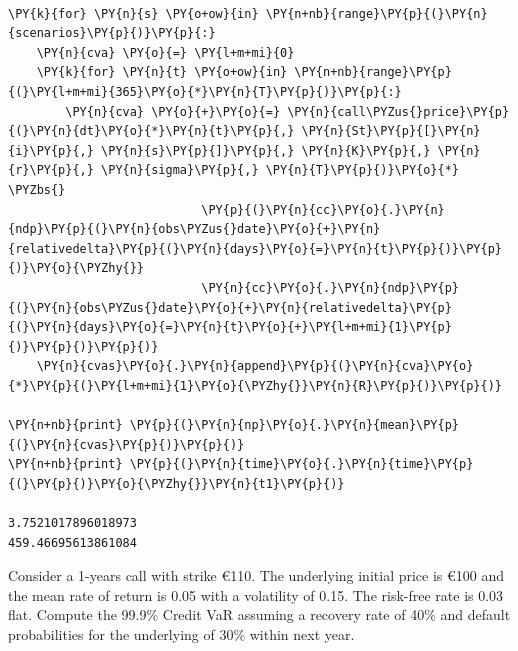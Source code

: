 \begin{Answer}
\begin{tcolorbox}[size=fbox, boxrule=1pt, colback=cellbackground, colframe=cellborder]
\begin{Verbatim}[commandchars=\\\{\}]
	
\PY{k}{for} \PY{n}{s} \PY{o+ow}{in} \PY{n+nb}{range}\PY{p}{(}\PY{n}{scenarios}\PY{p}{)}\PY{p}{:}
    \PY{n}{cva} \PY{o}{=} \PY{l+m+mi}{0}
    \PY{k}{for} \PY{n}{t} \PY{o+ow}{in} \PY{n+nb}{range}\PY{p}{(}\PY{l+m+mi}{365}\PY{o}{*}\PY{n}{T}\PY{p}{)}\PY{p}{:} 
        \PY{n}{cva} \PY{o}{+}\PY{o}{=} \PY{n}{call\PYZus{}price}\PY{p}{(}\PY{n}{dt}\PY{o}{*}\PY{n}{t}\PY{p}{,} \PY{n}{St}\PY{p}{[}\PY{n}{i}\PY{p}{,} \PY{n}{s}\PY{p}{]}\PY{p}{,} \PY{n}{K}\PY{p}{,} \PY{n}{r}\PY{p}{,} \PY{n}{sigma}\PY{p}{,} \PY{n}{T}\PY{p}{)}\PY{o}{*} \PYZbs{}
                           \PY{p}{(}\PY{n}{cc}\PY{o}{.}\PY{n}{ndp}\PY{p}{(}\PY{n}{obs\PYZus{}date}\PY{o}{+}\PY{n}{relativedelta}\PY{p}{(}\PY{n}{days}\PY{o}{=}\PY{n}{t}\PY{p}{)}\PY{p}{)}\PY{o}{\PYZhy{}}
                           \PY{n}{cc}\PY{o}{.}\PY{n}{ndp}\PY{p}{(}\PY{n}{obs\PYZus{}date}\PY{o}{+}\PY{n}{relativedelta}\PY{p}{(}\PY{n}{days}\PY{o}{=}\PY{n}{t}\PY{o}{+}\PY{l+m+mi}{1}\PY{p}{)}\PY{p}{)}\PY{p}{)}        
    \PY{n}{cvas}\PY{o}{.}\PY{n}{append}\PY{p}{(}\PY{n}{cva}\PY{o}{*}\PY{p}{(}\PY{l+m+mi}{1}\PY{o}{\PYZhy{}}\PY{n}{R}\PY{p}{)}\PY{p}{)}
				
\PY{n+nb}{print} \PY{p}{(}\PY{n}{np}\PY{o}{.}\PY{n}{mean}\PY{p}{(}\PY{n}{cvas}\PY{p}{)}\PY{p}{)}
\PY{n+nb}{print} \PY{p}{(}\PY{n}{time}\PY{o}{.}\PY{n}{time}\PY{p}{(}\PY{p}{)}\PY{o}{\PYZhy{}}\PY{n}{t1}\PY{p}{)}

3.7521017896018973
459.46695613861084
\end{Verbatim}
\end{tcolorbox}
\end{Answer}

\begin{Exercise}[title={(Credit VaR)}]
Consider a 1-years call with strike \euro{110}. The underlying initial price is \euro{100} and the mean rate of return is 0.05 with a volatility of 0.15. The risk-free rate is 0.03 flat.
Compute the 99.9\% Credit VaR assuming a recovery rate of 40\% and default probabilities for the underlying of 30\% within next year.
\end{Exercise}

